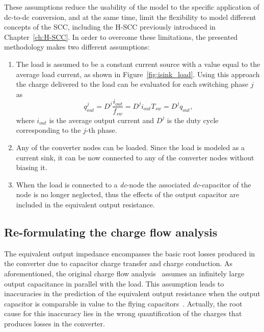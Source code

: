 These assumptions reduce the usability of the model to the specific application of dc-to-dc conversion, and at the same time, limit the flexibility to model different concepts of the SCC, including the H-SCC previously introduced in Chapter~\ref{ch:H-SCC}. In order to overcome these limitations, the presented methodology makes two different assumptions:
\begin{enumerate}
  \item The load is assumed to be a constant current source with a value equal to the average load current, as shown in Figure~\ref{fig:isink_load}. Using this approach the charge delivered to the load can be evaluated for each switching phase $j$ as
      \begin{equation}
        q_{out}^j = D^j \frac{i_{out}}{f_{sw}} = D^j i_{out}{T_{sw}}  = D^j q_{out},
      \label{eq:q_out}
      \end{equation}
  where $i_{out}$ is the average output current and $D^j$ is the duty cycle corresponding to the $j$-th phase.


  \item Any of the converter nodes can be loaded. Since the load is modeled as a current sink, it can be now connected to any of the converter nodes without biasing it.

  \item When the load is connected to a \emph{dc}-node the associated \emph{dc}-capacitor of the node is no longer neglected, thus the effects of the output capacitor are included in the equivalent output resistance.

\end{enumerate}


\subsection{Re-formulating the charge flow analysis}

The equivalent output impedance encompasses the basic root losses produced in the converter due to capacitor charge transfer and charge conduction. As aforementioned, the original charge flow analysis~\cite{95Makowski} assumes an infinitely large output capacitance in parallel with the load. This assumption leads to inaccuracies in the prediction of the equivalent output resistance when the output capacitor is comparable in value to the flying capacitors~\cite{2013Breussegem:c_out}. Actually, the root cause for this inaccuracy lies in the wrong quantification of the charges that produces losses in the converter.\\

